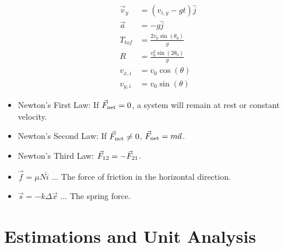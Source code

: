 \documentclass[10pt]{article}
\begin{document}
\begin{itemize}
\begin{align}
\vec{v}_y &= (v_{i,y} - g t) \hat{j} \\
\vec{a} &= -g \hat{j} \\
T_{tof} &= \frac{2 v_0\sin(\theta_0)}{g} \\
R &= \frac{v_0^2\sin(2\theta_0)}{g} \\
v_{x,i} &= v_0 \cos(\theta) \\
v_{y,i} &= v_0 \sin(\theta)
\end{align}
\item Newton's First Law: If $\vec{F}_{\rm net} = 0$, a system will remain at rest or constant velocity.
\item Newton's Second Law: If $\vec{F}_{\rm net} \neq 0$, $\vec{F}_{\rm net} = m\vec{a}$.
\item Newton's Third Law: $\vec{F}_{\rm 12} = - \vec{F}_{\rm 21}$.
\item $\vec{f} = \mu N \hat{i}$ ... The force of friction in the horizontal direction.
\item $\vec{s} = - k \Delta \vec{x}$ ... The spring force.
\end{itemize}

\clearpage

\section{Estimations and Unit Analysis}
\end{document}
